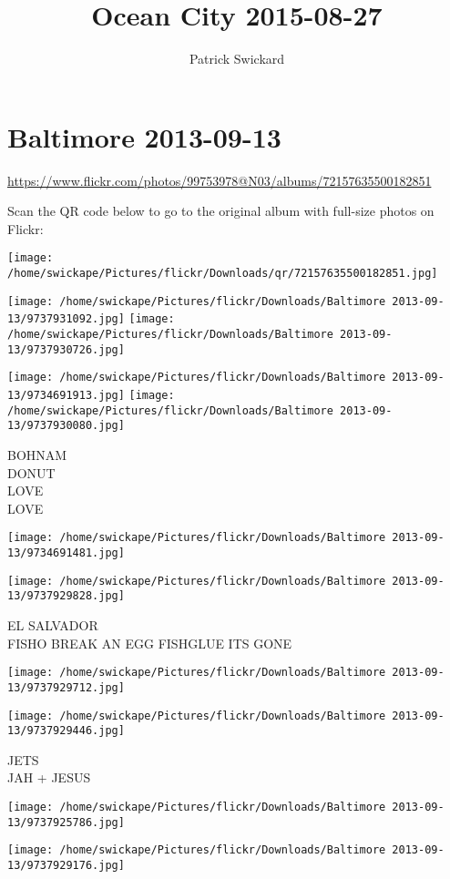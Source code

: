 \documentclass[10pt,letterpaper]{article}
\title{Ocean City 2015-08-27}
\author{Patrick Swickard}
\date{}
\begin{document}
\section*{Baltimore 2013-09-13}

\url{https://www.flickr.com/photos/99753978@N03/albums/72157635500182851}

Scan the QR code below to go to the original album with full-size photos on Flickr:

\texttt{[image: /home/swickape/Pictures/flickr/Downloads/qr/72157635500182851.jpg]}
\pagebreak

\texttt{[image: /home/swickape/Pictures/flickr/Downloads/Baltimore 2013-09-13/9737931092.jpg]}
\texttt{[image: /home/swickape/Pictures/flickr/Downloads/Baltimore 2013-09-13/9737930726.jpg]}

\texttt{[image: /home/swickape/Pictures/flickr/Downloads/Baltimore 2013-09-13/9734691913.jpg]}
\texttt{[image: /home/swickape/Pictures/flickr/Downloads/Baltimore 2013-09-13/9737930080.jpg]}

BOHNAM\\
DONUT\\
LOVE\\
LOVE
\pagebreak

\texttt{[image: /home/swickape/Pictures/flickr/Downloads/Baltimore 2013-09-13/9734691481.jpg]}

\vspace{0.25in}
\texttt{[image: /home/swickape/Pictures/flickr/Downloads/Baltimore 2013-09-13/9737929828.jpg]}

EL SALVADOR\\
FISHO BREAK AN EGG FISHGLUE ITS GONE
\pagebreak

\texttt{[image: /home/swickape/Pictures/flickr/Downloads/Baltimore 2013-09-13/9737929712.jpg]}

\vspace{0.25in}
\texttt{[image: /home/swickape/Pictures/flickr/Downloads/Baltimore 2013-09-13/9737929446.jpg]}

JETS\\
JAH + JESUS
\pagebreak

\texttt{[image: /home/swickape/Pictures/flickr/Downloads/Baltimore 2013-09-13/9737925786.jpg]}

\vspace{0.25in}
\texttt{[image: /home/swickape/Pictures/flickr/Downloads/Baltimore 2013-09-13/9737929176.jpg]}
\end{document}
